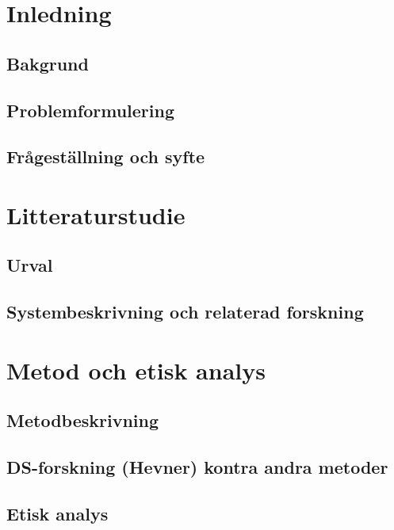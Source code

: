 \documentclass[swedish]{maucsthesis}
\begin{document}
\section{Inledning}
    \subsection{Bakgrund}
        
    \subsection{Problemformulering}
        
    \subsection{Frågeställning och syfte}
        

\section{Litteraturstudie}\label{sec:litteraturstudie}
    \subsection{Urval}\label{subsec:urval}
        
    \subsection{Systembeskrivning och relaterad forskning}\label{subsec:systembeskrivning-och-relaterad-forskning}
    

\section{Metod och etisk analys}\label{sec:metod}
    \subsection{Metodbeskrivning}
        
        
        
    \subsection{DS-forskning (Hevner) kontra andra metoder}
        
    \subsection{Etisk analys}
        
\end{document}
